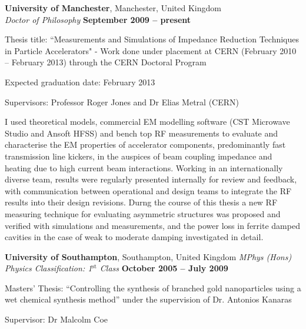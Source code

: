 \documentclass[margin,line]{resume}
\begin{document}
\begin{resume}
    \textbf{University of Manchester}, Manchester, United Kingdom \vspace{2mm}\\\vspace{1mm}%
    \textsl{Doctor of Philosophy} \hfill \textbf{ September 2009 -- present}\vspace{-3mm}\\\vspace{-1mm}%
    \begin{list2}
        \item Thesis title: ``Measurements and Simulations of Impedance Reduction Techniques in Particle Accelerators" - Work done under placement at CERN (February 2010 -- February 2013) through the CERN Doctoral Program
        \item Expected graduation date: February 2013
        \item Supervisors:  Professor Roger Jones and Dr Elias Metral (CERN)
        \item I used theoretical models, commercial EM modelling software (CST Microwave Studio and Ansoft HFSS) and bench top RF measurements to evaluate and characterise the EM properties of accelerator components, predominantly fast transmission line kickers, in the auspices of beam coupling impedance and heating due to high current beam interactions. Working in an internationally diverse team, results were regularly presented internally for review and feedback, with communication between operational and design teams to integrate the RF results into their design revisions. Durng the course of this thesis a new RF measuring technique for evaluating asymmetric structures was proposed and verified with simulations and measurements, and the power loss in ferrite damped cavities in the case of weak to moderate damping investigated in detail.
    \end{list2}\vspace{-1.5mm}
    \textbf{ University of Southampton}, Southampton, United Kingdom 
    \textsl{MPhys (Hons) Physics Classification: 1$^{\mathrm{st}}$ Class} \hfill \textbf{October 2005 -- July 2009}\vspace{-3mm}\\\vspace{-1mm}%
    \begin{list2}
        \item Masters' Thesis: ``Controlling the synthesis of branched gold nanoparticles using a wet chemical synthesis method'' under the supervision of Dr. Antonios Kanaras
        \item Supervisor: Dr Malcolm Coe
    \end{list2}\vspace{-1.5mm}


\end{resume}
\end{document}
